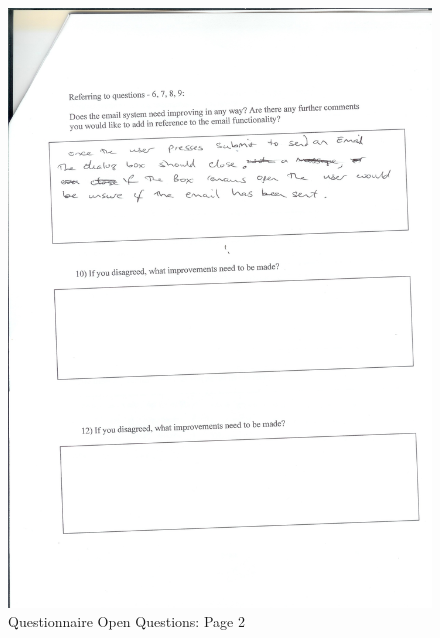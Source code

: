 \begin{figure}[H]
    \includegraphics[width=\textwidth]{./Evaluation/EvaluationQuestionnaire/Scan13.jpeg}
    \caption{Questionnaire Open Questions: Page 2} \label{fig:q2}
\end{figure}

